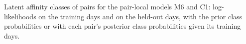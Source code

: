 \begin{table}[t]
\caption{Latent affinity classes of pairs for the pair-local models M6 and C1: log-likelihoods on the training days and on the held-out days, with the prior class probabilities or with each pair's posterior class probabilities given its training days.}
\label{tab:hetero}

\end{table}

